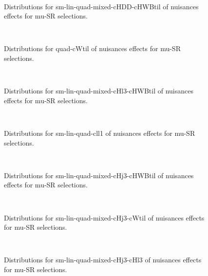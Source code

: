 \begin{figure}[htbp]  
\centering 
\\ 
\caption{ 
   Distributions for sm-lin-quad-mixed-cHDD-cHWBtil of nuisances effects for mu-SR selections.
} 
\label{fig:sm_lin_quad_mixed_cHDD_cHWBtil_mu_SR} 
\end{figure} 




\begin{figure}[htbp]  
\centering 
\\ 
\caption{ 
   Distributions for quad-cWtil of nuisances effects for mu-SR selections.
} 
\label{fig:quad_cWtil_mu_SR} 
\end{figure} 




\begin{figure}[htbp]  
\centering 
\\ 
\caption{ 
   Distributions for sm-lin-quad-mixed-cHl3-cHWBtil of nuisances effects for mu-SR selections.
} 
\label{fig:sm_lin_quad_mixed_cHl3_cHWBtil_mu_SR} 
\end{figure} 




\begin{figure}[htbp]  
\centering 
\\ 
\caption{ 
   Distributions for sm-lin-quad-cll1 of nuisances effects for mu-SR selections.
} 
\label{fig:sm_lin_quad_cll1_mu_SR} 
\end{figure} 




\begin{figure}[htbp]  
\centering 
\\ 
\caption{ 
   Distributions for sm-lin-quad-mixed-cHj3-cHWBtil of nuisances effects for mu-SR selections.
} 
\label{fig:sm_lin_quad_mixed_cHj3_cHWBtil_mu_SR} 
\end{figure} 




\begin{figure}[htbp]  
\centering 
\\ 
\caption{ 
   Distributions for sm-lin-quad-mixed-cHj3-cWtil of nuisances effects for mu-SR selections.
} 
\label{fig:sm_lin_quad_mixed_cHj3_cWtil_mu_SR} 
\end{figure} 




\begin{figure}[htbp]  
\centering 
\\ 
\caption{ 
   Distributions for sm-lin-quad-mixed-cHj3-cHl3 of nuisances effects for mu-SR selections.
} 
\label{fig:sm_lin_quad_mixed_cHj3_cHl3_mu_SR} 
\end{figure} 




